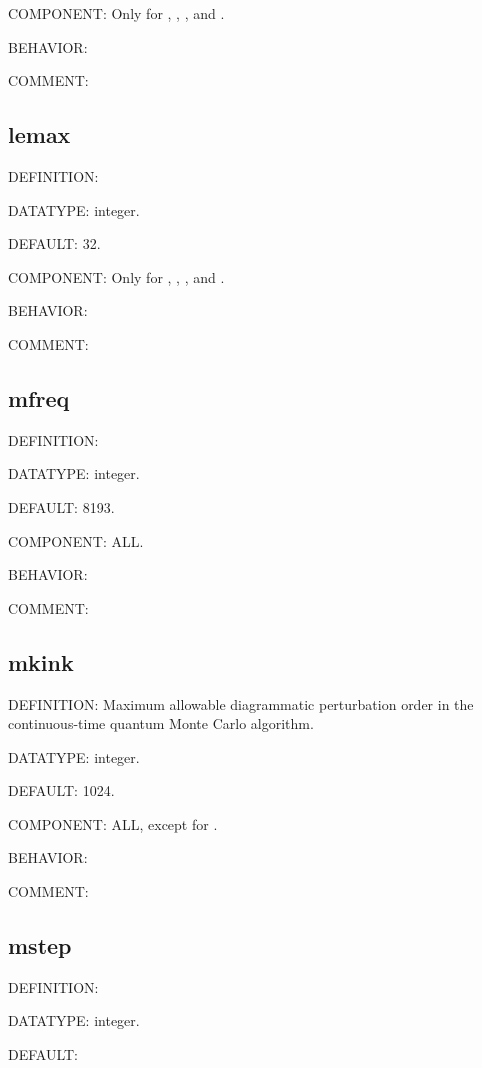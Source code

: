 {\color{brown}COMPONENT:} Only for {\gardenia}, {\narcissus}, {\lavender}, and {\manjushaka}.

{\color{purple}BEHAVIOR:}

{\color{olive}COMMENT:}

\subsection{lemax}
{\color{red}DEFINITION:}

{\color{green}DATATYPE:} integer.

{\color{blue}DEFAULT:} 32.

{\color{brown}COMPONENT:} Only for {\gardenia}, {\narcissus}, {\lavender}, and {\manjushaka}.

{\color{purple}BEHAVIOR:}

{\color{olive}COMMENT:}

\subsection{mfreq}
{\color{red}DEFINITION:}

{\color{green}DATATYPE:} integer.

{\color{blue}DEFAULT:} 8193.

{\color{brown}COMPONENT:} ALL.

{\color{purple}BEHAVIOR:}

{\color{olive}COMMENT:}

\subsection{mkink}
{\color{red}DEFINITION:} Maximum allowable diagrammatic perturbation order in the continuous-time quantum Monte Carlo algorithm.

{\color{green}DATATYPE:} integer.

{\color{blue}DEFAULT:} 1024.

{\color{brown}COMPONENT:} ALL, except for {\daisy}.

{\color{purple}BEHAVIOR:}

{\color{olive}COMMENT:}

\subsection{mstep}
{\color{red}DEFINITION:}

{\color{green}DATATYPE:} integer.

{\color{blue}DEFAULT:}

